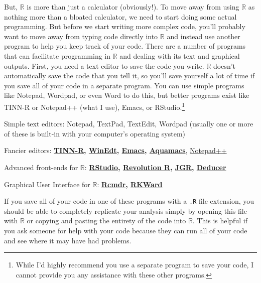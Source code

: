 \documentclass[12pt]{article}
\begin{document}
But, $\mathbb{R}$ is more than just a calculator (obviously!). To move away from using $\mathbb{R}$ as nothing more than a bloated calculator, we need to start doing some actual programming. But before we start writing more complex code, you'll probably want to move away from typing code directly into $\mathbb{R}$ and instead use another program to help you keep track of your code. There are a number of programs that can facilitate programming in $\mathbb{R}$ and dealing with its text and graphical outputs. First, you need a text editor to save the code you write. $\mathbb{R}$ doesn't automatically save the code that you tell it, so you'll save yourself a lot of time if you save all of your code in a separate program. You can use simple programs like Notepad, Wordpad, or even Word to do this, but better programs exist like TINN-R or Notepad++ (what I use), Emacs, or RStudio.\footnote{While I'd highly recommend you use a separate program to save your code, I cannot provide you any assistance with these other programs.}
\begin{itemize*}
\item Simple text editors: Notepad, TextPad, TextEdit, Wordpad (usually one or more of these is built-in with your computer's operating system)
\item Fancier editors: \textbf{\href{http://sciviews.org/Tinn-R/}{TINN-R}, \href{http://www.winedt.com/}{WinEdt}, \href{http://www.gnu.org/software/emacs/}{Emacs}, \href{http://aquamacs.org/}{Aquamacs}}, \href{http://notepad-plus-plus.org/}{Notepad++}
\item Advanced front-ends for $\mathbb{R}$: \textbf{\href{http://rstudio.org/}{RStudio}, \href{http://www.revolutionanalytics.com/products/revolution-enterprise.php}{Revolution R}, \href{http://rforge.net/JGR/}{JGR}, \href{http://www.deducer.org/pmwiki/pmwiki.php}{Deducer}}
\item Graphical User Interface for $\mathbb{R}$: \textbf{\href{http://socserv.mcmaster.ca/jfox/Misc/Rcmdr/}{Rcmdr}, \href{http://rkward.sourceforge.net/}{RKWard}}
\end{itemize*}

If you save all of your code in one of these programs with a \verb|.R| file extension, you should be able to completely replicate your analysis simply by opening this file with $\mathbb{R}$ or copying and pasting the entirety of the code into $\mathbb{R}$. This is helpful if you ask someone for help with your code because they can run all of your code and see where it may have had problems.
\end{document}
